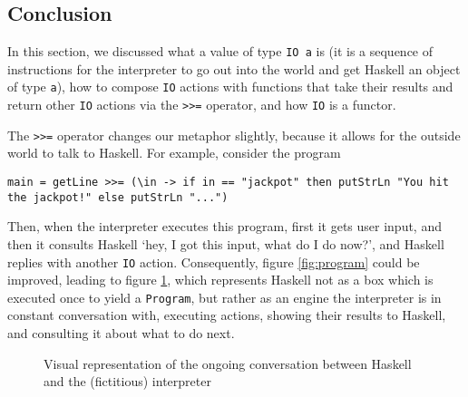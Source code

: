 \documentclass[11pt]{article}
\theoremstyle{nonumberplain}
\newcommand*\lsin{\lstinline}
\begin{document}
\subsection{Conclusion}

In this section, we discussed what a value of type \lsin|IO a| is (it is a sequence of instructions for the interpreter to go out into the world and get Haskell an object of type \lsin|a|), how to compose \lsin|IO| actions with functions that take their results and return other \lsin|IO| actions via the \lsin|>>=| operator, and how \lsin|IO| is a functor.

The \lsin|>>=| operator changes our metaphor slightly, because it allows for the outside world to talk to Haskell. For example, consider the program
\begin{lstlisting}
main = getLine >>= (\in -> if in == "jackpot" then putStrLn "You hit the jackpot!" else putStrLn "...")
\end{lstlisting}

Then, when the interpreter executes this program, first it gets user input, and then it consults Haskell `hey, I got this input, what do I do now?', and Haskell replies with another \lsin|IO| action. Consequently, figure \ref{fig:program} could be improved, leading to figure \ref{fig:program2}, which represents Haskell not as a box which is executed once to yield a \lsin|Program|, but rather as an engine the interpreter is in constant conversation with, executing actions, showing their results to Haskell, and consulting it about what to do next.
\begin{figure}
\centering
{}
\caption{Visual representation of the ongoing conversation between Haskell and the (fictitious) interpreter}\label{fig:program2}
\end{figure}
\end{document}
